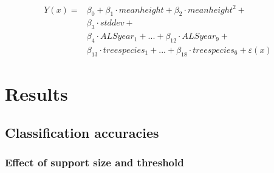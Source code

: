 \begin{equation} \label{eq:chmtspec_fullmod_term}
\begin{split}
Y(x) = &\beta_{0} + \beta_{1} \cdot meanheight + \beta_{2} \cdot meanheight^{2} + \\ 
&\beta_{3} \cdot stddev + \\
&\beta_{4} \cdot ALSyear_1 + ... + \beta_{12} \cdot ALSyear_9 + \\
&\beta_{13} \cdot treespecies_1 + ... + \beta_{18} \cdot treespecies_6 + \varepsilon(x)
\end{split}
\end{equation}




\section{Results}
\label{sec:Res}

\subsection{Classification accuracies}
\label{sec:supp_tspec_res}

\subsubsection*{Effect of support size and threshold}

